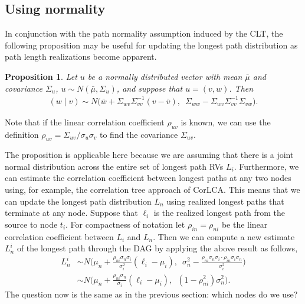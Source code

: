 \documentclass[12pt]{article}
\newtheorem{prop}[theorem]{Proposition}
\begin{document}

\subsection{Using normality}
\label{subsect.updating_normality}

In conjunction with the path normality assumption induced by the CLT, the following proposition may be useful for updating the longest path distribution as path length realizations become apparent.
\begin{prop}
	Let $u$ be a normally distributed vector with mean $\bar{\mu}$ and covariance $\Sigma_u$, $u \sim N(\bar{\mu}, \Sigma_u)$, and suppose that $u = (v, w)$. Then 
	\begin{align*}
	(w \mid v) \sim N \big( \bar{w} + \Sigma_{wv}\Sigma_{vv}^{-1} (v - \bar{v}), \enspace  \Sigma_{ww} - \Sigma_{wv} \Sigma_{vv}^{-1} \Sigma_{vw} \big).
	\end{align*}
\end{prop}
Note that if the linear correlation coefficient $\rho_{uv}$ is known, we can use the definition $\rho_{uv} = \Sigma_{uv} / \sigma_u \sigma_v$ to find the covariance $\Sigma_{uv}$.

The proposition is applicable here because we are assuming that there is a joint normal distribution across the entire set of longest path RVs $L_i$. Furthermore, we can estimate the correlation coefficient between longest paths at any two nodes using, for example, the correlation tree approach of CorLCA. This means that we can update the longest path distribution $L_n$ using realized longest paths that terminate at any node. Suppose that $\ell_i$ is the realized longest path from the source to node $t_i$. For compactness of notation let $\rho_{in} = \rho_{ni}$ be the linear correlation coefficient between $L_i$ and $L_n$. Then we can compute a new estimate $L_n^i$ of the longest path through the DAG by applying the above result as follows,
\begin{align*}
L_n^i &\sim N \bigg( \mu_{n} + \frac{\rho_{ni} \sigma_{n} \sigma_{i}}{\sigma_{i}^2} (\ell_i - \mu_{i}), \enspace \sigma_{n}^2 - \frac{\rho_{ni} \sigma_{n} \sigma_{i} \cdot \rho_{in} \sigma_{i} \sigma_{n}}{\sigma_{i}^2} \bigg) \nonumber\\
&\sim N \bigg(\mu_{n} + \frac{\rho_{ni} \sigma_{n}}{\sigma_{i}} (\ell_i - \mu_{i}), \enspace (1 - \rho_{ni}^2) \sigma_{n}^2 \bigg).
\end{align*}
The question now is the same as in the previous section: which nodes do we use?
\end{document}
